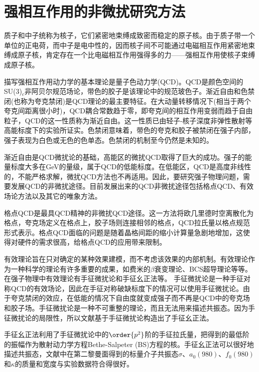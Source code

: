 \section{强相互作用的非微扰研究方法}
质子和中子统称为核子，它们紧密地束缚成致密而稳定的原子核。由于质子带一个单位的正电荷，而中子是电中性的，因而核子间不可能通过电磁相互作用紧密地束缚成原子核，肯定存在一个比电磁相互作用强得多的力——强相互作用使核子束缚成原子核。\par
描写强相互作用动力学的基本理论是量子色动力学(QCD)。QCD是颜色空间的SU(3)$_c$非阿贝尔规范场论\cite{PhysRevLett.30.1343,PhysRevLett.30.1346,greensite2011introduction}，带色的胶子是该理论中的规范玻色子。渐近自由和色禁闭(也称为夸克禁闭)是QCD理论的最主要特征。在大动量转移情况下(相当于两个夸克间距离很小时)，QCD耦合常数趋于零，即夸克间的相互作用变弱而趋于自由粒子，QCD的这一性质称为渐近自由。这一性质已由轻子-核子深度非弹性散射等高能标度下的实验所证实。色禁闭意味着，带色的夸克和胶子被禁闭在强子内部，强子表现为白色或无色的色单态。色禁闭的机制至今仍然是未知的。\par
渐近自由是QCD微扰论的基础，高能区的微扰QCD取得了巨大的成功。强子的能量标度大多在GeV的量级，属于QCD的低能标度。在低能区，QCD是高度非线性的，不能严格求解，微扰QCD方法也不再适用。因此，要研究强子物理问题，需要发展QCD的非微扰途径。目前发展出来的QCD非微扰途径包括格点QCD、有效场论方法以及其它的唯象方法。\par
格点QCD是最具QCD精神的非微扰QCD途径。这一方法将欧几里德时空离散化为格点，夸克场定义在格点上，胶子场则连接相邻的格点\cite{PhysRevLett.92.022001,PhysRevD.10.2445}，QCD拉氏量以格点规范形式表示。格点QCD面临的问题是随着晶格间距的缩小计算量急剧地增加，这使得对硬件的需求很高，给格点QCD的应用带来限制。\par
有效理论旨在只对确定的某种效果建模，而不考虑该效果的内部机制\cite{stamatescu2007approaches}。有效理论作为一种科学的理论有许多重要的成果，如费米的$\beta$衰变理论、BCS超导理论等等。在强子物理中有效理论有手征微扰论和手征幺正法等。
手征微扰论是一种手征对称QCD的有效场论，因此在手征对称破缺标度下的情况可以使用手征微扰论\cite{Leutwyler:2012,LEUTWYLER1994165,scherer2011primer,GASSER1984142,GASSER1985465}。由于夸克禁闭的效应，在低能的情况下自由度就变成强子而不再是QCD中的夸克场和胶子场。手征微扰论是一种不可重整的理论，而且无法用来描述共振态。因为手征微扰论的局限性，所以文献\cite{OLLER1997438}基于手征微扰论构造出了手征幺正法。\par
手征幺正法利用了手征微扰论中的$\order{p^2}$阶的手征拉氏量\cite{KAISER1995325}，把得到的最低阶的振幅作为散射动力学方程Bethe-Salpeter (BS)方程的核。手征幺正法可以很好地描述共振态，文献\cite{OLLER1997438}中在第二黎曼面得到的标量介子共振态$\sigma$、$a_{0}(980)$、$f_{0}(980)$和$\kappa$的质量和宽度与实验数据符合得很好。\vspace{-1cm}
